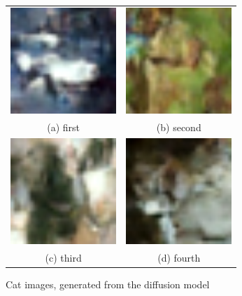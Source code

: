 \documentclass[conference]{IEEEtran}
\begin{document}
    \begin{figure}
      \begin{tabular}{cc}
        \includegraphics[width=40mm]{./images/generated-imgs/cat/0306.png} 
    &   \includegraphics[width=40mm]{./images/generated-imgs/cat/0307.png} 
    \\
      (a) first 
      & (b) second \\[6pt]
         \includegraphics[width=40mm]{./images/generated-imgs/cat/0308.png} 
      &  \includegraphics[width=40mm]{./images/generated-imgs/cat/0309.png} 
    \\
      (c) third & (d) fourth \\[6pt]
      \end{tabular}
      \caption{Cat images, generated from the diffusion model}
      \end{figure}
  
\end{document}
